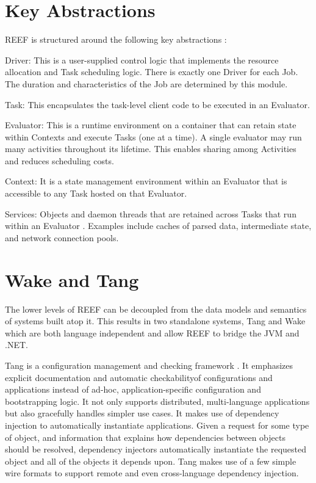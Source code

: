 \documentclass[9pt,twocolumn,twoside]{../../styles/osajnl}
\begin{document}
\section{Key Abstractions}

REEF is structured around the following key abstractions
\cite{reefarticle}:

Driver: This is a user-supplied control logic that implements the
resource allocation and Task scheduling logic. There is exactly one
Driver for each Job. The duration and characteristics of the Job are
determined by this module.

Task: This encapsulates the task-level client code to be executed in
an Evaluator.

Evaluator: This is a runtime environment on a container that can
retain state within Contexts and execute Tasks (one at a time). A
single evaluator may run many activities throughout its lifetime. This
enables sharing among Activities and reduces scheduling costs.

Context: It is a state management environment within an Evaluator that
is accessible to any Task hosted on that Evaluator.

Services: Objects and daemon threads that are retained across Tasks
that run within an Evaluator \cite{reefpaper}. Examples include caches
of parsed data, intermediate state, and network connection pools.

\section{Wake and Tang}

The lower levels of REEF can be decoupled from the data models and
semantics of systems built atop it. This results in two standalone
systems, Tang and Wake which are both language independent and allow
REEF to bridge the JVM and .NET.\newline

Tang is a configuration management and checking framework
\cite{reeftang}. It emphasizes explicit documentation and automatic
checkability\SE of configurations and applications instead of ad-hoc,
application-specific configuration and bootstrapping logic. It not
only supports distributed, multi-language applications but also
gracefully handles simpler use cases. It makes use of dependency
injection to automatically instantiate applications. Given a request
for some type of object, and information that explains how
dependencies between objects should be resolved, dependency injectors
automatically instantiate the requested object and all of the objects
it depends upon. Tang makes use of a few simple wire formats to
support remote and even cross-language dependency injection.\newline
\end{document}
